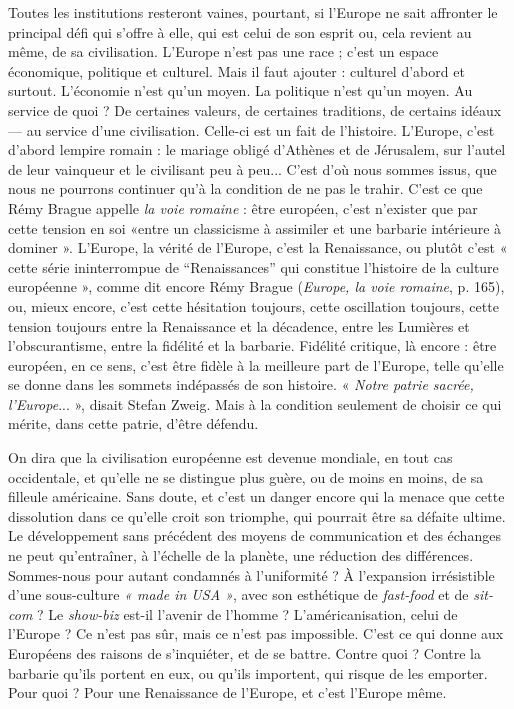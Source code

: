 Toutes les institutions resteront vaines, pourtant, si l’Europe ne sait
affronter le principal défi qui s'offre à elle, qui est celui de son esprit ou, cela
revient au même, de sa civilisation. L'Europe n’est pas une race ; c’est un espace
économique, politique et culturel. Mais il faut ajouter : culturel d’abord et surtout.
L'économie n’est qu’un moyen. La politique n’est qu’un moyen. Au service
de quoi ? De certaines valeurs, de certaines traditions, de certains idéaux —
au service d’une civilisation. Celle-ci est un fait de l’histoire. L'Europe, c’est
d’abord lempire romain : le mariage obligé d’Athènes et de Jérusalem, sur
l'autel de leur vainqueur et le civilisant peu à peu... C’est d’où nous sommes
issus, que nous ne pourrons continuer qu'à la condition de ne pas le trahir.
C’est ce que Rémy Brague appelle {\it la voie romaine} : être européen, c’est n’exister
que par cette tension en soi «entre un classicisme à assimiler et une barbarie
intérieure à dominer ». L'Europe, la vérité de l’Europe, c’est la Renaissance, ou
plutôt c’est « cette série ininterrompue de “Renaissances” qui constitue l’histoire
de la culture européenne », comme dit encore Rémy Brague ({\it Europe, la
voie romaine}, p. 165), ou, mieux encore, c’est cette hésitation toujours, cette
oscillation toujours, cette tension toujours entre la Renaissance et la décadence,
entre les Lumières et l’obscurantisme, entre la fidélité et la barbarie. Fidélité
critique, là encore : être européen, en ce sens, c’est être fidèle à la meilleure part
de l’Europe, telle qu’elle se donne dans les sommets indépassés de son histoire.
« {\it Notre patrie sacrée, l'Europe}... », disait Stefan Zweig. Mais à la condition seulement
de choisir ce qui mérite, dans cette patrie, d’être défendu.

On dira que la civilisation européenne est devenue mondiale, en tout cas
occidentale, et qu’elle ne se distingue plus guère, ou de moins en moins, de sa
filleule américaine. Sans doute, et c’est un danger encore qui la menace que
cette dissolution dans ce qu’elle croit son triomphe, qui pourrait être sa défaite
ultime. Le développement sans précédent des moyens de communication et des
échanges ne peut qu’entraîner, à l’échelle de la planète, une réduction des différences.
Sommes-nous pour autant condamnés à l’uniformité ? À l’expansion
irrésistible d’une sous-culture {\it « made in USA »}, avec son esthétique de {\it fast-food}
et de {\it sit-com} ? Le {\it show-biz} est-il l'avenir de l’homme ? L’américanisation, celui
de l'Europe ? Ce n’est pas sûr, mais ce n’est pas impossible. C’est ce qui donne
aux Européens des raisons de s'inquiéter, et de se battre. Contre quoi ? Contre
la barbarie qu’ils portent en eux, ou qu’ils importent, qui risque de les
emporter. Pour quoi ? Pour une Renaissance de l’Europe, et c’est l’Europe
même.

